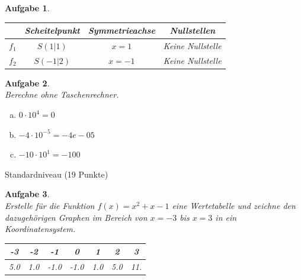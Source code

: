 \documentclass[11pt,fleqn]{article}
\theoremstyle{aufg}
\newtheorem{aufgabe}{Aufgabe}
\theoremstyle{bsp}
\begin{document}
\begin{flushleft}
\begin{aufgabe}
\begin{minipage}{0.25\textwidth}
\end{minipage} 
\begin{minipage}{0.1\textwidth} 
 ~ \end{minipage} 
\begin{minipage}{0.55\textwidth} 
\renewcommand{\arraystretch}{1.3} 
\begin{tabular}{c|c|c|c}
 & Scheitelpunkt & Symmetrieachse & Nullstellen\\ \hline 
$f_1$ & $S(1|1)$ & $x=1$ & Keine Nullstelle\\ \hline 
$f_2$ & $S(-1|2)$ & $x=-1$ & Keine Nullstelle\\ 

\end{tabular} 

\end{minipage} 

\end{aufgabe} 
\begin{aufgabe} ~ \\ 
Berechne ohne Taschenrechner. \\ 
\begin{multicols}{3} 
\begin{enumerate}[a)] 
\item 
$0\cdot10^{4}=0$
\item 
$-4\cdot10^{-5}=-4e-05$
\item 
$-10\cdot10^{1}=-100$
\end{enumerate} 
\end{multicols} 
\end{aufgabe} 

 \clearpage 
\begin{center} \begin{framed} Standardniveau (19 Punkte) \end{framed} \end{center}\begin{aufgabe} ~ \\ 
Erstelle f\"ur die Funktion $f(x)=x^{2} + x - 1$ eine Wertetabelle und zeichne den dazugeh\"origen Graphen im Bereich von $x=-3$ bis $x=3$ in ein Koordinatensystem. \\ 
\renewcommand{\arraystretch}{1.0} 
\begin{tabular}{c|c|c|c|c|c|c}
-3 & -2 & -1 & 0 & 1 & 2 & 3\\ \hline 
5.0 & 1.0 & -1.0 & -1.0 & 1.0 & 5.0 & 11.\\ 


\end{tabular}
\end{aufgabe}
\end{flushleft}
\end{document}
